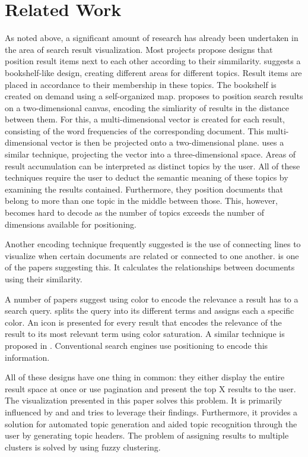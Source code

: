 \section{Related Work}
As noted above, a significant amount of research has already been undertaken in the area of search result visualization. Most projects propose designs that position result items next to each other according to their simmilarity. \cite{Rauber2000} suggests a bookshelf-like design, creating different areas for different topics. Result items are placed in accordance to their membership in these topics. The bookshelf is created on demand using a self-organized map. \cite{Paulovich2008} proposes to position search results on a two-dimensional canvas, encoding the simliarity of results in the distance between them. For this, a multi-dimensional vector is created for each result, consisting of the word frequencies of the corresponding document. This multi-dimensional vector is then be projected onto a two-dimensional plane. \cite{Einsfeld2006} uses a similar technique, projecting the vector into a three-dimensional space. Areas of result accumulation can be interpreted as distinct topics by the user. All of these techniques require the user to deduct the semantic meaning of these topics by examining the results contained. Furthermore, they position documents that belong to more than one topic in the middle between those. This, however, becomes hard to decode as the number of topics exceeds the number of dimensions available for positioning.

Another encoding technique frequently suggested is the use of connecting lines to visualize when certain documents are related or connected to one another. \cite{Zaina2005} is one of the papers suggesting this. It calculates the relationships between documents using their similarity.

A number of papers suggest using color to encode the relevance a result has to a search query. \cite{Mukherjea1999} splits the query into its different terms and assigns each a specific color. An icon is presented for every result that encodes the relevance of the result to its most relevant term using color saturation. A similar technique is proposed in \cite{Hoeber2006}. Conventional search engines use positioning to encode this information.

All of these designs have one thing in common: they either display the entire result space at once or use pagination and present the top X results to the user. The visualization presented in this paper solves this problem. It is primarily influenced by \cite{Rauber2000} and \cite{Hoeber2006} and tries to leverage their findings. Furthermore, it provides a solution for automated topic generation and aided topic recognition through the user by generating topic headers. The problem of assigning results to multiple clusters is solved by using fuzzy clustering.

